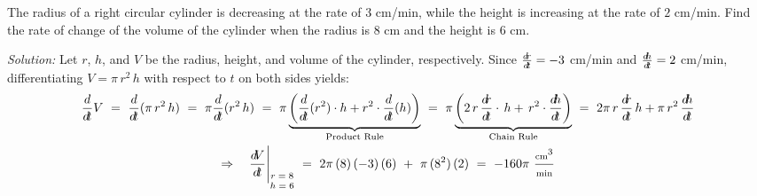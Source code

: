 \begin{exmp}\label{exmp:relrate3}
\noindent The radius of a right circular cylinder is decreasing at the rate of
$3$ cm/min, while the height is increasing at the rate of $2$ cm/min. Find the
rate of change of the volume of the cylinder when the radius is $8$ cm and the
height is $6$ cm.\vspace{1mm}
\par\noindent\emph{Solution:} Let $r$, $h$, and $V$ be the radius, height, and
volume of the cylinder, respectively. Since
$\frac{d\!r}{d\!t} = -3$ cm/min and $\frac{d\negmedspace h}{d\!t} = 2$ cm/min,
differentiating $V = \pi\,r^2 \,h$ with respect to $t$ on both sides yields:
\vspace{-0.7em}
\begin{gather*}
  \ddt V ~=~ \ddt (\pi\,r^2 \,h) ~=~ \pi \ddt (r^2 \,h) ~=~ \pi
  \underbrace{\left(\ddt (r^2) \cdot h + r^2 \cdot
    \ddt(h)\right)}_\text{Product Rule} ~=~ \pi \underbrace{\left(
    2\,r\,\drdt\cdot\,h + \,r^2 \cdot\frac{d\negmedspace h}{\dt}
    \right)}_\text{Chain Rule} ~=~ 2\pi \,r\,\drdt\,h +
  \pi\,r^2\,\frac{d\negmedspace h}{\dt} \\
  \Rightarrow\quad
  \dVdt\Biggr|_{\text{\scriptsize{$\begin{matrix}r=8\\h=6\end{matrix}$}}}
  ~=~ 2\pi\,(8)\,(-3)\,(6) ~+~ \pi\,(8^2)\,(2) ~=~
  -160\pi~\frac{\text{\scriptsize cm}^3}{\text{\scriptsize min}}
\end{gather*}
\end{exmp}
\vspace{-0.5em}
\divider
\vspace{1mm}
 
